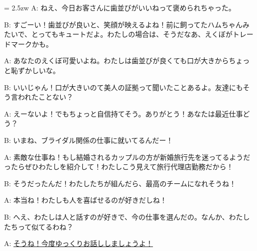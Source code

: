 \documentclass[11pt]{amsart}
\title{}
\author{}
\newenvironment{hangall}[1]{\hangindent = 2.5zw\everypar{\hangindent = 2.5zw}}{}
\begin{document}
\maketitle
\begin{hangall}{}%
A: ねえ、今日お客さんに歯並びがいいねって褒められちゃった。

B: すごーい！歯並びが良いと、笑顔が映えるよね！前に飼ってたハムちゃんみたいで、とってもキュートだよ。わたしの場合は、そうだなあ、えくぼがトレードマークかも。

A: あなたのえくぼ可愛いよね。わたしは歯並びが良くても口が大きからちょっと恥ずかしいな。

B: いいじゃん！口が大きいのて美人の証拠って聞いたことあるよ。友達にもそう言われたことない？

A: えーないよ！でもちょっと自信持てそう。ありがとう！あなたは最近仕事どう？

B: いまね、ブライダル関係の仕事に就いてるんだー！

A: 素敵な仕事ね！もし結婚されるカップルの方が新婚旅行先を迷ってるようだったらぜひわたしを紹介して！わたしこう見えて旅行代理店勤務だから！

B: そうだったんだ！わたしたちが組んだら、最高のチームになれそうね！

A: 本当ね！わたしも人を喜ばせるのが好きだしね！

B: へえ、わたしは人と話すのが好きで、今の仕事を選んだの。なんか、わたしたちって似てるわね？

A: \ul{そうね！今度ゆっくりお話ししましょうよ！}\end{hangall}
\end{document}
